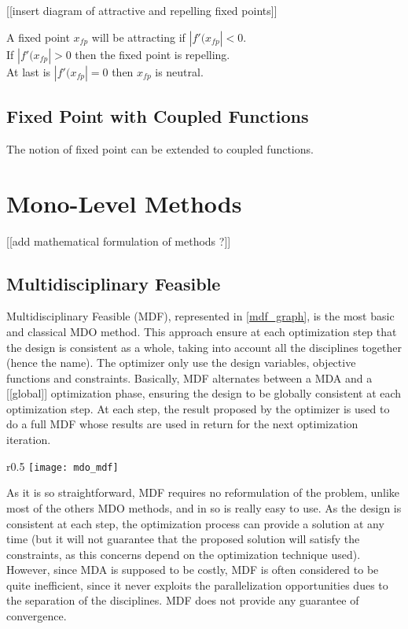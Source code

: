[[insert diagram of attractive and repelling fixed points]]

A fixed point $x_{fp}$ will be attracting if $|f'(x_{fp}| < 0$.\\
If $|f'(x_{fp}| > 0$ then the fixed point is repelling.\\
At last is $|f'(x_{fp}| = 0$ then $x_{fp}$ is neutral.


\subsection{Fixed Point with Coupled Functions}

The notion of fixed point can be extended to coupled functions.


\section{Mono-Level Methods}

[[add mathematical formulation of methods ?]]

\subsection{Multidisciplinary Feasible}

Multidisciplinary Feasible (MDF), represented in \figurename{} \ref{mdf_graph}, is the most basic and classical MDO method. This approach ensure at each optimization step that the design is consistent as a whole, taking into account all the disciplines together (hence the name). The optimizer only use the design variables, objective functions and constraints.
Basically, MDF alternates between a MDA and a [[global]] optimization phase, ensuring the design to be globally consistent at each optimization step. At each step, the result proposed by the optimizer is used to do a full MDF whose results are used in return for the next optimization iteration.

\begin{wrapfigure}{r}{0.5\textwidth}
\centering
\texttt{[image: mdo\_mdf]}
\caption{MDF method}\label{mdf_graph}
\end{wrapfigure}

As it is so straightforward, MDF requires no reformulation of the problem, unlike most of the others MDO methods, and in so is really easy to use. As the design is consistent at each step, the optimization process can provide a solution at any time (but it will not guarantee that the proposed solution will satisfy the constraints, as this concerns depend on the optimization technique used). However, since MDA is supposed to be costly, MDF is often considered to be quite inefficient, since it never exploits the parallelization opportunities dues to the separation of the disciplines. MDF does not provide any guarantee of convergence.

